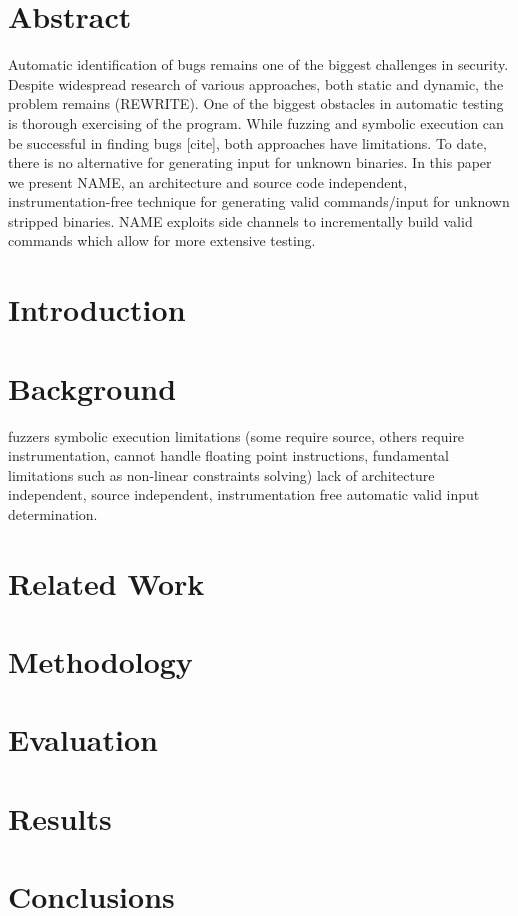 \documentclass[11pt,twocolumn]{article}
\begin{document}
{}
  
\section{Abstract}
Automatic identification of bugs remains one of the biggest challenges in security.
Despite widespread research of various approaches, both static and dynamic, the problem remains (REWRITE).
One of the biggest obstacles in automatic testing is thorough exercising of the program.
While fuzzing and symbolic execution can be successful in finding bugs [cite], both approaches have limitations.
To date, there is no alternative for generating input for unknown binaries.
In this paper we present NAME, an architecture and source code independent, instrumentation-free technique for generating valid commands/input for unknown stripped binaries.
NAME exploits side channels to incrementally build valid commands which allow for more extensive testing.

\section{Introduction}



\section{Background}



fuzzers 
symbolic execution limitations (some require source, others require instrumentation, cannot handle floating point instructions, fundamental limitations such as non-linear constraints solving)
lack of architecture independent, source independent, instrumentation free automatic valid input determination.

\section{Related Work}

\section{Methodology}

\section{Evaluation}

\section{Results}

\section{Conclusions}
\end{document}
